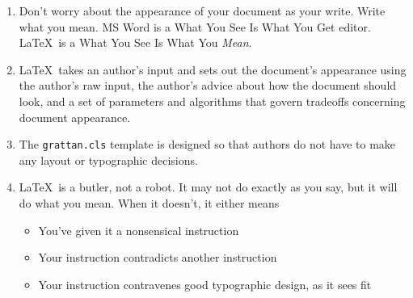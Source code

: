 \documentclass[a4paper,11pt]{scrreprt}\usepackage[]{graphicx}\usepackage[]{color}
\let\oldLaTeX\LaTeX
\renewcommand{\LaTeX}{\textrm{\oldLaTeX}}
\begin{document}
 \begin{enumerate}
  \item Don't worry about the appearance of your document as your write. Write what you mean. MS Word is a What You See Is What You Get editor. \LaTeX\ is a What You See Is What You \emph{Mean}.
  \item \LaTeX\ takes an author's input and sets out the document's appearance using the author's raw input, the author's advice about how the document should look, and a set of parameters and algorithms that govern tradeoffs concerning document appearance. 
  \item The \verb=grattan.cls= template is designed so that authors do not have to make any layout or typographic decisions.
  \item \LaTeX\ is a butler, not a robot. It may not do exactly as you say, but it will do what you mean. When it doesn't, it either means 
  \begin{itemize}
   \item You've given it a nonsensical instruction
   \item Your instruction contradicts another instruction
   \item Your instruction contravenes good typographic design, as it sees fit
  \end{itemize}


\end{enumerate}
\end{document}
